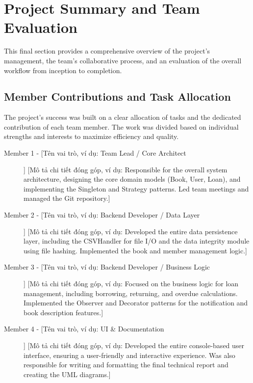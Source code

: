 \section{Project Summary and Team Evaluation}
\label{sec:team_evaluation}

This final section provides a comprehensive overview of the project's management, the team's collaborative process, and an evaluation of the overall workflow from inception to completion.

\subsection{Member Contributions and Task Allocation}
The project's success was built on a clear allocation of tasks and the dedicated contribution of each team member. The work was divided based on individual strengths and interests to maximize efficiency and quality.

\begin{description}
	\item[Member 1 - [Tên vai trò, ví dụ: Team Lead / Core Architect]]
	      [Mô tả chi tiết đóng góp, ví dụ: Responsible for the overall system architecture, designing the core domain models (Book, User, Loan), and implementing the Singleton and Strategy patterns. Led team meetings and managed the Git repository.]

	\item[Member 2 - [Tên vai trò, ví dụ: Backend Developer / Data Layer]]
	      [Mô tả chi tiết đóng góp, ví dụ: Developed the entire data persistence layer, including the CSVHandler for file I/O and the data integrity module using file hashing. Implemented the book and member management logic.]

	\item[Member 3 - [Tên vai trò, ví dụ: Backend Developer / Business Logic]]
	      [Mô tả chi tiết đóng góp, ví dụ: Focused on the business logic for loan management, including borrowing, returning, and overdue calculations. Implemented the Observer and Decorator patterns for the notification and book description features.]

	\item[Member 4 - [Tên vai trò, ví dụ: UI \& Documentation]]
	      [Mô tả chi tiết đóng góp, ví dụ: Developed the entire console-based user interface, ensuring a user-friendly and interactive experience. Was also responsible for writing and formatting the final technical report and creating the UML diagrams.]

\end{description}

